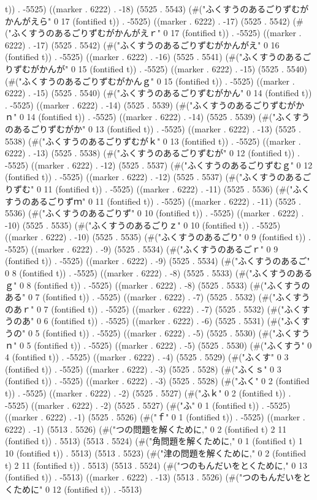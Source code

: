 {t)) . -5525) ((marker . 6222) . -18) (5525 . 5543) (#("ふくすうのあるごりずむがかんがえら" 0 17 (fontified t)) . -5525) ((marker . 6222) . -17) (5525 . 5542) (#("ふくすうのあるごりずむがかんがえｒ" 0 17 (fontified t)) . -5525) ((marker . 6222) . -17) (5525 . 5542) (#("ふくすうのあるごりずむがかんがえ" 0 16 (fontified t)) . -5525) ((marker . 6222) . -16) (5525 . 5541) (#("ふくすうのあるごりずむがかんが" 0 15 (fontified t)) . -5525) ((marker . 6222) . -15) (5525 . 5540) (#("ふくすうのあるごりずむがかんｇ" 0 15 (fontified t)) . -5525) ((marker . 6222) . -15) (5525 . 5540) (#("ふくすうのあるごりずむがかん" 0 14 (fontified t)) . -5525) ((marker . 6222) . -14) (5525 . 5539) (#("ふくすうのあるごりずむがかｎ" 0 14 (fontified t)) . -5525) ((marker . 6222) . -14) (5525 . 5539) (#("ふくすうのあるごりずむがか" 0 13 (fontified t)) . -5525) ((marker . 6222) . -13) (5525 . 5538) (#("ふくすうのあるごりずむがｋ" 0 13 (fontified t)) . -5525) ((marker . 6222) . -13) (5525 . 5538) (#("ふくすうのあるごりずむが" 0 12 (fontified t)) . -5525) ((marker . 6222) . -12) (5525 . 5537) (#("ふくすうのあるごりずむｇ" 0 12 (fontified t)) . -5525) ((marker . 6222) . -12) (5525 . 5537) (#("ふくすうのあるごりずむ" 0 11 (fontified t)) . -5525) ((marker . 6222) . -11) (5525 . 5536) (#("ふくすうのあるごりずｍ" 0 11 (fontified t)) . -5525) ((marker . 6222) . -11) (5525 . 5536) (#("ふくすうのあるごりず" 0 10 (fontified t)) . -5525) ((marker . 6222) . -10) (5525 . 5535) (#("ふくすうのあるごりｚ" 0 10 (fontified t)) . -5525) ((marker . 6222) . -10) (5525 . 5535) (#("ふくすうのあるごり" 0 9 (fontified t)) . -5525) ((marker . 6222) . -9) (5525 . 5534) (#("ふくすうのあるごｒ" 0 9 (fontified t)) . -5525) ((marker . 6222) . -9) (5525 . 5534) (#("ふくすうのあるご" 0 8 (fontified t)) . -5525) ((marker . 6222) . -8) (5525 . 5533) (#("ふくすうのあるｇ" 0 8 (fontified t)) . -5525) ((marker . 6222) . -8) (5525 . 5533) (#("ふくすうのある" 0 7 (fontified t)) . -5525) ((marker . 6222) . -7) (5525 . 5532) (#("ふくすうのあｒ" 0 7 (fontified t)) . -5525) ((marker . 6222) . -7) (5525 . 5532) (#("ふくすうのあ" 0 6 (fontified t)) . -5525) ((marker . 6222) . -6) (5525 . 5531) (#("ふくすうの" 0 5 (fontified t)) . -5525) ((marker . 6222) . -5) (5525 . 5530) (#("ふくすうｎ" 0 5 (fontified t)) . -5525) ((marker . 6222) . -5) (5525 . 5530) (#("ふくすう" 0 4 (fontified t)) . -5525) ((marker . 6222) . -4) (5525 . 5529) (#("ふくす" 0 3 (fontified t)) . -5525) ((marker . 6222) . -3) (5525 . 5528) (#("ふくｓ" 0 3 (fontified t)) . -5525) ((marker . 6222) . -3) (5525 . 5528) (#("ふく" 0 2 (fontified t)) . -5525) ((marker . 6222) . -2) (5525 . 5527) (#("ふｋ" 0 2 (fontified t)) . -5525) ((marker . 6222) . -2) (5525 . 5527) (#("ふ" 0 1 (fontified t)) . -5525) ((marker . 6222) . -1) (5525 . 5526) (#("ｆ" 0 1 (fontified t)) . -5525) ((marker . 6222) . -1) (5513 . 5526) (#("つの問題を解くために," 0 2 (fontified t) 2 11 (fontified t)) . 5513) (5513 . 5524) (#("角問題を解くために," 0 1 (fontified t) 1 10 (fontified t)) . 5513) (5513 . 5523) (#("津の問題を解くために," 0 2 (fontified t) 2 11 (fontified t)) . 5513) (5513 . 5524) (#("つのもんだいをとくために," 0 13 (fontified t)) . -5513) ((marker . 6222) . -13) (5513 . 5526) (#("つのもんだいをとくために" 0 12 (fontified t)) . -5513) }
